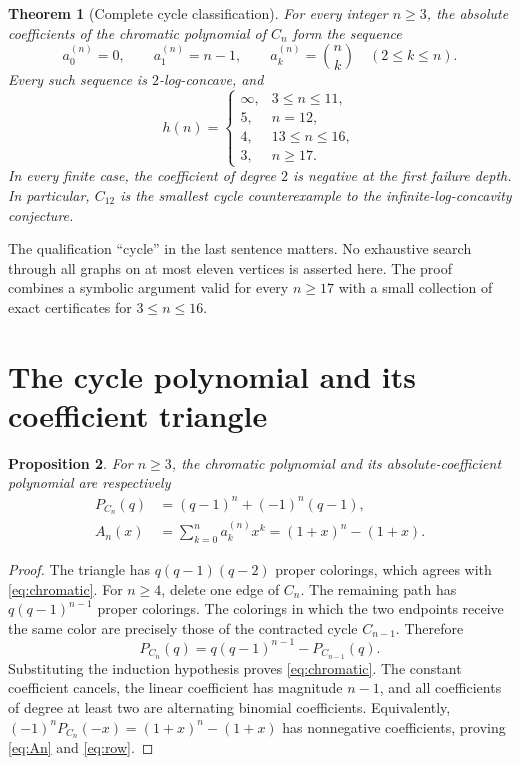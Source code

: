\documentclass[11pt,a4paper]{article}
\newtheorem{theorem}{Theorem}[section]
\newtheorem{proposition}[theorem]{Proposition}
\theoremstyle{definition}
\newcommand{\bin}[2]{\binom{#1}{#2}}
\begin{document}
\begin{theorem}[Complete cycle classification]\label{thm:main}
For every integer $n\ge3$, the absolute coefficients of the chromatic
polynomial of $C_n$ form the sequence
\begin{equation}\label{eq:row}
  a^{(n)}_0=0,\qquad a^{(n)}_1=n-1,\qquad
  a^{(n)}_k=\bin nk\quad(2\le k\le n).
\end{equation}
Every such sequence is $2$-log-concave, and
\begin{equation}\label{eq:classification}
 h(n)=
 \begin{cases}
   \infty,&3\le n\le11,\\
   5,&n=12,\\
   4,&13\le n\le16,\\
   3,&n\ge17.
 \end{cases}
\end{equation}
In every finite case, the coefficient of degree $2$ is negative at the
first failure depth. In particular, $C_{12}$ is the smallest cycle
counterexample to the infinite-log-concavity conjecture.
\end{theorem}

The qualification ``cycle'' in the last sentence matters. No exhaustive
search through all graphs on at most eleven vertices is asserted here.
The proof combines a symbolic argument valid for every $n\ge17$ with a
small collection of exact certificates for $3\le n\le16$.

\section{The cycle polynomial and its coefficient triangle}\label{sec:cycle}

\begin{proposition}\label{prop:chromatic}
For $n\ge3$, the chromatic polynomial and its absolute-coefficient
polynomial are respectively
\begin{align}
 P_{C_n}(q)&=(q-1)^n+(-1)^n(q-1),\label{eq:chromatic}\\
 A_n(x)&=\sum_{k=0}^n a^{(n)}_kx^k
       =(1+x)^n-(1+x).\label{eq:An}
\end{align}
\end{proposition}
\begin{proof}
The triangle has $q(q-1)(q-2)$ proper colorings, which agrees with
\eqref{eq:chromatic}. For $n\ge4$, delete one edge of $C_n$. The remaining
path has $q(q-1)^{n-1}$ proper colorings. The colorings in which the two
endpoints receive the same color are precisely those of the contracted
cycle $C_{n-1}$. Therefore
\[
  P_{C_n}(q)=q(q-1)^{n-1}-P_{C_{n-1}}(q).
\]
Substituting the induction hypothesis proves \eqref{eq:chromatic}.
The constant coefficient cancels, the linear coefficient has magnitude
$n-1$, and all coefficients of degree at least two are alternating
binomial coefficients. Equivalently,
$(-1)^nP_{C_n}(-x)=(1+x)^n-(1+x)$ has nonnegative coefficients, proving
\eqref{eq:An} and \eqref{eq:row}.
\end{proof}
\end{document}
